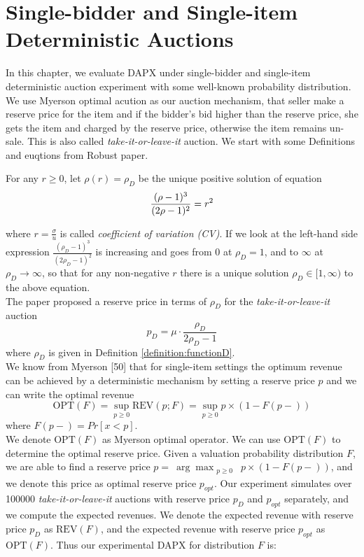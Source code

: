 \chapter{Single-bidder and Single-item Deterministic Auctions}
\label{ch:DAPX}
In this chapter, we evaluate DAPX under single-bidder and single-item deterministic auction experiment with some well-known probability distribution. We use Myerson optimal acution as our auction mechanism, that seller make a reserve price for the item and if the bidder's bid higher than the reserve price, she gets the item and charged by the reserve price, otherwise the item remains un-sale. This is also called \textit{take-it-or-leave-it} auction. We start with some Definitions and euqtions from Robust paper.
\begin{definition}
	\label{definition:functionD}
	For any $r \geqslant 0$, let $\rho(r) = \rho_D$ be the unique positive solution of equation
	\begin{equation}\notag
	\frac{(\rho - 1)^3}{(2\rho - 1)^2} = r^2
	\end{equation}
\end{definition}
where $r = \frac{\sigma}{u}$ is called \textit{coefficient of variation (CV)}. If we look at the left-hand side expression $\frac {(\rho_{D}-1)^{3}}{(2\rho_{D}-1)^{2}}$ is increasing and goes from 0 at $\rho_{D} = 1$, and to $\infty$ at $\rho_{D} \rightarrow \infty$, so that for any non-negative $r$ there is a unique solution $\rho_{D} \in [1,\infty)$ to the above equation. \\
The paper proposed a reserve price in terms of $\rho_D$ for the \textit{take-it-or-leave-it} auction 
\begin{equation}
\label{equation:rhoD}
	p_D =  \mu \cdot \frac{\rho_{D}}{2\rho_{D}-1} 
\end{equation}
where $\rho_{D}$ is given in Definition \ref{definition:functionD}.\\We know from Myerson [50] that for single-item settings the optimum revenue can be achieved by a deterministic mechanism by setting a reserve price $p$ and we can write the optimal revenue
\begin{equation}
\text{OPT}(F) = \sup_{p \geqslant 0} \text{REV}(p;F) = \sup_{p \geqslant 0} p \times \left(1-F(p-)\right) 
\end{equation}
where $F(p-) = Pr[x<p]$. \\
We denote $\text{OPT}(F)$ as Myerson optimal operator. We can use $\text{OPT}(F)$ to determine the optimal reserve price. Given a valuation probability distribution $F$, we are able to find a reserve price $p =\displaystyle\ \arg \max_{\substack{p \geqslant 0}} \ p \times \left(1-F(p-)\right)$, and we denote this price as optimal reserve price $p_{opt}$. Our experiment simulates over 100000 \textit{take-it-or-leave-it} auctions with reserve price $p_D$ and $p_{opt}$ separately, and we compute the expected revenues. We denote the expected revenue with reserve price $p_D$ as $\text{REV}(F)$, and the expected revenue with reserve price $p_{opt}$ as $\text{OPT}(F)$. Thus our experimental DAPX for distribution $F$ is:

